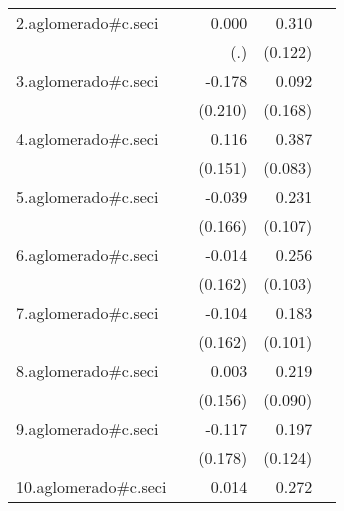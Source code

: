 {\begin{longtable}{l*{4}{D{.}{.}{-1}}}
\addlinespace
2.aglomerado#c.seci&                     &       0.000         &       0.310\sym{*}  &                     \\
            &                     &         (.)         &     (0.122)         &                     \\
\addlinespace
3.aglomerado#c.seci&                     &      -0.178         &       0.092         &                     \\
            &                     &     (0.210)         &     (0.168)         &                     \\
\addlinespace
4.aglomerado#c.seci&                     &       0.116         &       0.387\sym{***}&                     \\
            &                     &     (0.151)         &     (0.083)         &                     \\
\addlinespace
5.aglomerado#c.seci&                     &      -0.039         &       0.231\sym{*}  &                     \\
            &                     &     (0.166)         &     (0.107)         &                     \\
\addlinespace
6.aglomerado#c.seci&                     &      -0.014         &       0.256\sym{*}  &                     \\
            &                     &     (0.162)         &     (0.103)         &                     \\
\addlinespace
7.aglomerado#c.seci&                     &      -0.104         &       0.183         &                     \\
            &                     &     (0.162)         &     (0.101)         &                     \\
\addlinespace
8.aglomerado#c.seci&                     &       0.003         &       0.219\sym{*}  &                     \\
            &                     &     (0.156)         &     (0.090)         &                     \\
\addlinespace
9.aglomerado#c.seci&                     &      -0.117         &       0.197         &                     \\
            &                     &     (0.178)         &     (0.124)         &                     \\
\addlinespace
10.aglomerado#c.seci&                     &       0.014         &       0.272\sym{**} &                     \\

\end{longtable}}
